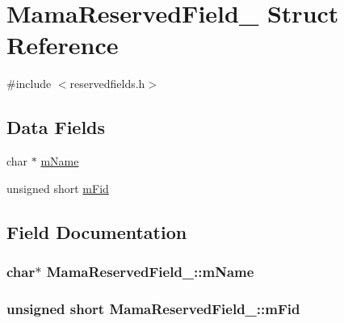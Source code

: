 \hypertarget{structMamaReservedField__}{
\section{MamaReservedField\_\- Struct Reference}
\label{structMamaReservedField__}
}


{\ttfamily \#include $<$reservedfields.h$>$}\subsection*{Data Fields}
\begin{DoxyCompactItemize}
\item 
char $\ast$ \hyperlink{structMamaReservedField___aeca98a4fc194c5dc17fea22e399c660b}{mName}
\item 
unsigned short \hyperlink{structMamaReservedField___a88ae850687b184359477ffa9d075afb0}{mFid}
\end{DoxyCompactItemize}


\subsection{Field Documentation}
\hypertarget{structMamaReservedField___aeca98a4fc194c5dc17fea22e399c660b}{
\subsubsection[{mName}]{\setlength{\rightskip}{0pt plus 5cm}char$\ast$ {\bf MamaReservedField\_\-::mName}}}
\label{structMamaReservedField___aeca98a4fc194c5dc17fea22e399c660b}
\hypertarget{structMamaReservedField___a88ae850687b184359477ffa9d075afb0}{
\subsubsection[{mFid}]{\setlength{\rightskip}{0pt plus 5cm}unsigned short {\bf MamaReservedField\_\-::mFid}}}
\label{structMamaReservedField___a88ae850687b184359477ffa9d075afb0}
